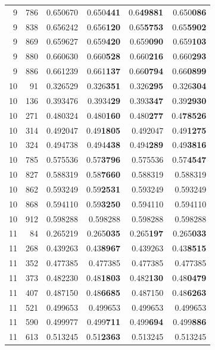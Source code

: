 \documentclass[10pt]{article}
\begin{document}
{\begin{longtable}{rrrrrr}
9 & 786 & 0.650670 & 0.650\textbf{441} & 0.6\textbf{49881} & 0.650\textbf{086} \\
9 & 838 & 0.656242 & 0.656\textbf{120} & 0.65\textbf{5753} & 0.65\textbf{5902} \\
9 & 869 & 0.659627 & 0.659\textbf{420} & 0.659\textbf{090} & 0.659\textbf{103} \\
9 & 880 & 0.660630 & 0.660\textbf{528} & 0.660\textbf{216} & 0.660\textbf{293} \\
9 & 886 & 0.661239 & 0.661\textbf{137} & 0.66\textbf{0794} & 0.66\textbf{0899} \\
10 & 91 & 0.326529 & 0.326\textbf{351} & 0.326\textbf{295} & 0.326\textbf{304} \\
10 & 136 & 0.393476 & 0.3934\textbf{29} & 0.393\textbf{347} & 0.39\textbf{2930} \\
10 & 271 & 0.480324 & 0.480\textbf{160} & 0.480\textbf{277} & 0.4\textbf{78526} \\
10 & 314 & 0.492047 & 0.49\textbf{1805} & 0.492047 & 0.49\textbf{1275} \\
10 & 324 & 0.494738 & 0.494\textbf{438} & 0.494\textbf{289} & 0.49\textbf{3816} \\
10 & 785 & 0.575536 & 0.57\textbf{3796} & 0.575536 & 0.57\textbf{4547} \\
10 & 827 & 0.588319 & 0.58\textbf{7660} & 0.588319 & 0.588319 \\
10 & 862 & 0.593249 & 0.59\textbf{2531} & 0.593249 & 0.593249 \\
10 & 868 & 0.594110 & 0.59\textbf{3250} & 0.594110 & 0.594110 \\
10 & 912 & 0.598288 & 0.598288 & 0.598288 & 0.598288 \\
11 & 84 & 0.265219 & 0.265\textbf{035} & 0.265\textbf{197} & 0.265\textbf{033} \\
11 & 268 & 0.439263 & 0.43\textbf{8967} & 0.439263 & 0.43\textbf{8515} \\
11 & 352 & 0.477385 & 0.477385 & 0.477385 & 0.477385 \\
11 & 373 & 0.482230 & 0.48\textbf{1803} & 0.482\textbf{130} & 0.48\textbf{0479} \\
11 & 407 & 0.487150 & 0.48\textbf{6685} & 0.487150 & 0.48\textbf{6263} \\
11 & 521 & 0.499653 & 0.499653 & 0.499653 & 0.499653 \\
11 & 590 & 0.499977 & 0.499\textbf{711} & 0.499\textbf{694} & 0.499\textbf{886} \\
11 & 613 & 0.513245 & 0.51\textbf{2363} & 0.513245 & 0.513245 \\

\end{longtable}}
\end{document}
